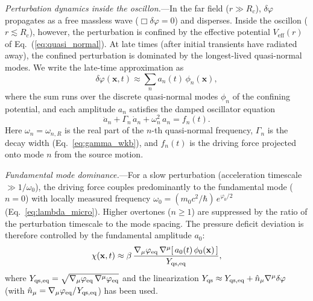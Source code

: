 \documentclass[aps,prd,onecolumn,superscriptaddress,nofootinbib,showpacs,12pt,notitlepage]{revtex4-2}
\begin{document}
\textit{Perturbation dynamics inside the oscillon.}---In
the far field ($r \gg R_c$), $\delta\varphi$ propagates as
a free massless wave ($\Box\delta\varphi = 0$) and
disperses.  Inside the oscillon ($r \lesssim R_c$),
however, the perturbation is confined by the effective
potential $V_{\mathrm{eff}}(r)$ of
Eq.~(\ref{eq:quasi_normal}).  At late times (after
initial transients have radiated away), the confined
perturbation is dominated by the longest-lived
quasi-normal modes.  We write the late-time
approximation as
\begin{equation}\label{eq:qnm_expansion}
  \delta\varphi(\mathbf{x},t)
  \approx \sum_n a_n(t)\,\phi_n(\mathbf{x}),
\end{equation}
where the sum runs over the discrete quasi-normal modes
$\phi_n$ of the confining potential, and each amplitude
$a_n$ satisfies the damped oscillator equation
\begin{equation}\label{eq:a_n_eom}
  \ddot{a}_n + \Gamma_n\,\dot{a}_n
  + \omega_{n}^2\,a_n = f_n(t).
\end{equation}
Here $\omega_n = \omega_{n,R}$ is the real part of the
$n$-th quasi-normal frequency, $\Gamma_n$ is the decay
width (Eq.~\ref{eq:gamma_wkb}), and $f_n(t)$ is the
driving force projected onto mode $n$ from the source
motion.

\textit{Fundamental mode dominance.}---For a slow
perturbation (acceleration timescale $\gg 1/\omega_0$),
the driving force couples predominantly to the fundamental
mode ($n = 0$) with locally measured frequency
$\omega_0 = (m_0 c^2/\hbar)\,e^{\varphi_0/2}$
(Eq.~\ref{eq:lambda_micro}).
Higher overtones ($n \geq 1$) are suppressed by the
ratio of the perturbation timescale to the mode spacing.
The pressure deficit deviation is therefore controlled by
the fundamental amplitude $a_0$:
\begin{equation}\label{eq:chi_a0}
  \chi(\mathbf{x},t)
  \approx \beta\,
    \frac{\nabla_\mu\varphi_{\mathrm{eq}}\,
      \nabla^\mu[\,a_0(t)\,\phi_0(\mathbf{x})\,]}
         {Y_{{\rm qs},\mathrm{eq}}},
\end{equation}
where $Y_{{\rm qs},\mathrm{eq}} =
\sqrt{\nabla_\mu\varphi_{\mathrm{eq}}\,
\nabla^\mu\varphi_{\mathrm{eq}}}$ and the linearization
$Y_{\rm qs} \approx Y_{{\rm qs},\mathrm{eq}} +
\hat{n}_\mu\nabla^\mu\delta\varphi$
(with $\hat{n}_\mu = \nabla_\mu\varphi_{\mathrm{eq}}
/Y_{{\rm qs},\mathrm{eq}}$) has been used.
\end{document}
